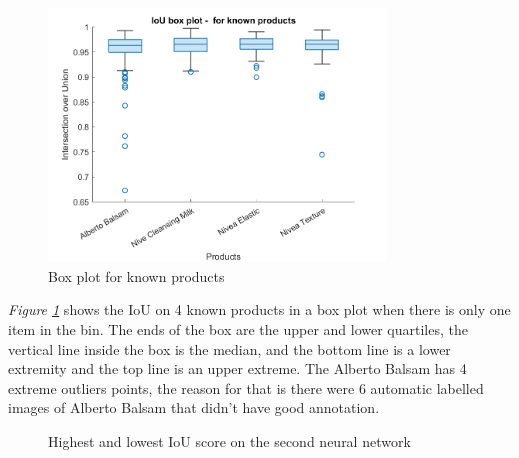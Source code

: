 \clearpage
\begin{figure}[h]
 \centering
 \includegraphics[width=0.8\textwidth]{graphics/results/v2boxplotForKnownProducts.png}
 \caption{Box plot for known products}
 \label{fig:v2boxknownproducts}
\end{figure}
\textit{Figure \ref{fig:v2boxknownproducts}} shows the IoU on 4 known products in a box plot when there is only one item in the bin. The ends of the box are the upper and lower quartiles, the vertical line inside the box is the median, and the bottom line is a lower extremity and the top line is an upper extreme. The Alberto Balsam has 4 extreme outliers points, the reason for that is there were 6 automatic labelled images of Alberto Balsam that didn’t have good annotation. 

\begin{figure}[h]
 \centering
 \hfill
 \caption{Highest and lowest IoU score on the second neural network}
 \label{figure: v2bestworst}
\end{figure}

